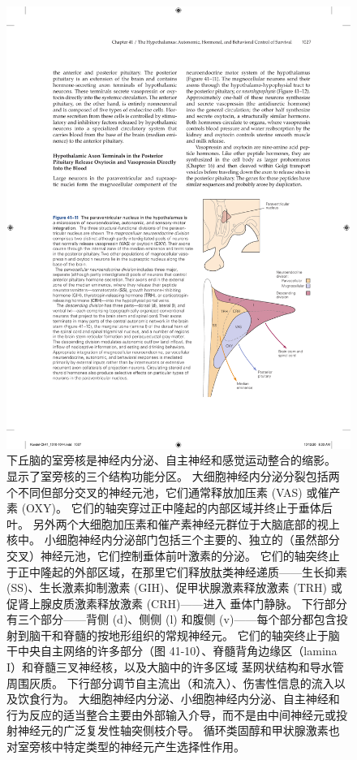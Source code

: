 \begin{figure}[htbp]
	\centering
	\includegraphics[width=0.5\linewidth]{chap41/fig_41_11}
	\caption{下丘脑的室旁核是神经内分泌、自主神经和感觉运动整合的缩影。 显示了室旁核的三个结构功能分区。 大细胞神经内分泌分裂包括两个不同但部分交叉的神经元池，它们通常释放加压素 (VAS) 或催产素 (OXY)。 它们的轴突穿过正中隆起的内部区域并终止于垂体后叶。 另外两个大细胞加压素和催产素神经元群位于大脑底部的视上核中。 小细胞神经内分泌部门包括三个主要的、独立的（虽然部分交叉）神经元池，它们控制垂体前叶激素的分泌。 它们的轴突终止于正中隆起的外部区域，在那里它们释放肽类神经递质——生长抑素 (SS)、生长激素抑制激素 (GIH)、促甲状腺激素释放激素 (TRH) 或促肾上腺皮质激素释放激素 (CRH)——进入 垂体门静脉。 下行部分有三个部分——背侧 (d)、侧侧 (l) 和腹侧 (v)——每个部分都包含投射到脑干和脊髓的按地形组织的常规神经元。 它们的轴突终止于脑干中央自主网络的许多部分（图 41-10）、脊髓背角边缘区（lamina I）和脊髓三叉神经核，以及大脑中的许多区域 茎网状结构和导水管周围灰质。 下行部分调节自主流出（和流入）、伤害性信息的流入以及饮食行为。 大细胞神经内分泌、小细胞神经内分泌、自主神经和行为反应的适当整合主要由外部输入介导，而不是由中间神经元或投射神经元的广泛复发性轴突侧枝介导。 循环类固醇和甲状腺激素也对室旁核中特定类型的神经元产生选择性作用。}
	\label{fig:41_11}
\end{figure}

